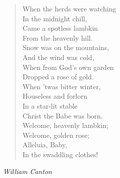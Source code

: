 
\begin{verse}
When the herds were watching\\
\hspace*{2em}In the midnight chill,\\
Came a spotless lambkin\\
\hspace*{2em}From the heavenly hill.\\[0.7em]

Snow was on the mountains,\\
\hspace*{2em}And the wind was cold,\\
When from God's own garden\\
\hspace*{2em}Dropped a rose of gold.\\[0.7em]

When 'twas bitter winter,\\
\hspace*{2em}Houseless and forlorn\\
In a star-lit stable\\
\hspace*{2em}Christ the Babe was born.\\[0.7em]

Welcome, heavenly lambkin;\\
\hspace*{2em}Welcome, golden rose;\\
Alleluia, Baby,\\
\hspace*{2em}In the swaddling clothes!%
\end{verse}

\vspace{0.5\baselineskip}
\noindent\textit{William Canton}

\newpage

